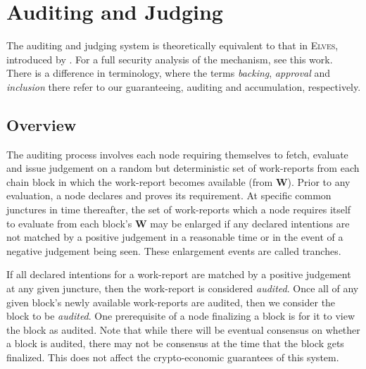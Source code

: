 \section{Auditing and Judging}\label{sec:auditing}

The auditing and judging system is theoretically equivalent to that in \textsc{Elves}, introduced by \cite{cryptoeprint:2024/961}. For a full security analysis of the mechanism, see this work. There is a difference in terminology, where the terms \emph{backing}, \emph{approval} and \emph{inclusion} there refer to our guaranteeing, auditing and accumulation, respectively.


\subsection{Overview}

The auditing process involves each node requiring themselves to fetch, evaluate and issue judgement on a random but deterministic set of work-reports from each \Jam chain block in which the work-report becomes available (\ie from $\mathbf{W}$). Prior to any evaluation, a node declares and proves its requirement. At specific common junctures in time thereafter, the set of work-reports which a node requires itself to evaluate from each block's $\mathbf{W}$ may be enlarged if any declared intentions are not matched by a positive judgement in a reasonable time or in the event of a negative judgement being seen. These enlargement events are called tranches.

If all declared intentions for a work-report are matched by a positive judgement at any given juncture, then the work-report is considered \emph{audited}. Once all of any given block's newly available work-reports are audited, then we consider the block to be \emph{audited}. One prerequisite of a node finalizing a block is for it to view the block as audited. Note that while there will be eventual consensus on whether a block is audited, there may not be consensus at the time that the block gets finalized. This does not affect the crypto-economic guarantees of this system.

